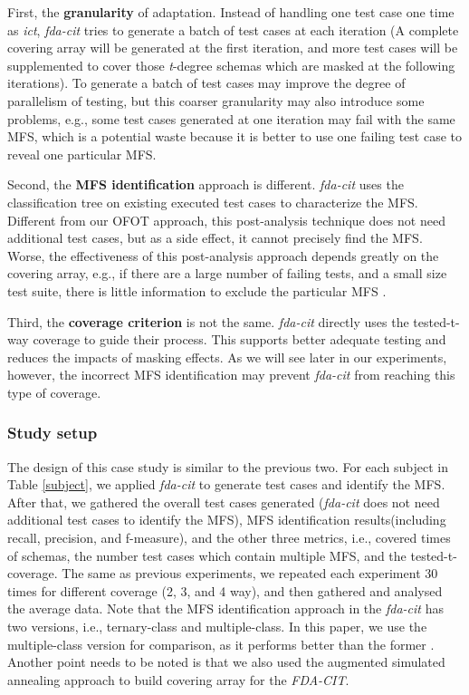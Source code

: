 \documentclass[journal,12pt,onecolumn,draftclsnofoot,]{IEEEtran}
\begin{document}
First, the \textbf{granularity} of adaptation. Instead of handling one test case one time as \emph{ict}, \emph{fda-cit} tries to generate a batch of test cases at each iteration (A complete covering array will be generated at the first iteration, and more test cases will be supplemented to cover those \emph{t}-degree schemas which are masked at the following iterations). To generate a batch of test cases may improve the degree of parallelism of testing, but this coarser granularity may also introduce some problems, e.g., some test cases generated at one iteration may fail with the same MFS, which is a potential waste because it is better to use one failing test case to reveal one particular MFS.

Second, the \textbf{MFS identification} approach is different. \emph{fda-cit} uses the classification tree on existing executed test cases to characterize the MFS. Different from our OFOT approach, this post-analysis technique does not need additional test cases, but as a side effect, it cannot precisely find the MFS. Worse, the effectiveness of this post-analysis approach depends greatly on the covering array, e.g., if there are a large number of failing tests, and a small size test suite, there is little information to exclude the particular MFS \cite{zhang2011characterizing}.

Third, the \textbf{coverage criterion} is not the same. \emph{fda-cit} directly uses the tested-t-way coverage to guide their process. This supports better adequate testing and reduces the impacts of masking effects. As we will see later in our experiments, however, the incorrect MFS identification may prevent \emph{fda-cit} from reaching this type of coverage.


\subsubsection{Study setup}
The design of this case study is similar to the previous two. For each subject in Table \ref{subject}, we applied \emph{fda-cit} to generate test cases and identify the MFS. After that, we gathered the overall test cases generated (\emph{fda-cit} does not need additional test cases to identify the MFS), MFS identification results(including recall, precision, and f-measure), and the other three metrics, i.e., covered times of schemas, the number test cases which contain multiple MFS, and the tested-t-coverage. The same as previous experiments, we repeated each experiment 30 times for different coverage (2, 3, and 4 way), and then gathered and analysed the average data.  Note that the MFS identification approach in the \emph{fda-cit} has two versions, i.e., ternary-class and multiple-class. In this paper, we use the multiple-class version for comparison, as it performs better than the former \cite{yilmaz2013reducing}. Another point needs to be noted is that we also used the augmented simulated annealing approach \cite{cohen2003augmenting,cohen2008constructing2} to build covering array for the \emph{FDA-CIT}.
\end{document}
